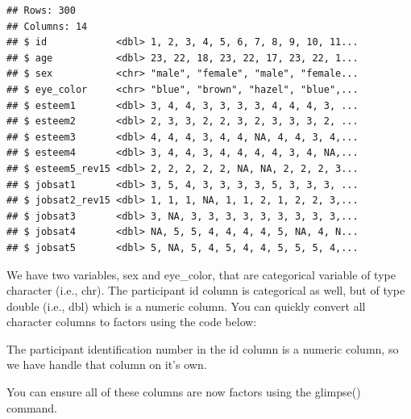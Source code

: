 \documentclass[
]{krantz}
\makeatletter
\newenvironment{Shaded}{\begin{snugshade}}{\end{snugshade}}
\newcommand{\DataTypeTok}[1]{\textcolor[rgb]{0.27,0.27,0.27}{#1}}
\newcommand{\KeywordTok}[1]{\textcolor[rgb]{0.27,0.27,0.27}{\textbf{#1}}}
\newcommand{\NormalTok}[1]{#1}
\newcommand{\OperatorTok}[1]{\textcolor[rgb]{0.43,0.43,0.43}{\textbf{#1}}}
\newcommand{\StringTok}[1]{\textcolor[rgb]{0.5,0.5,0.5}{#1}}
\newenvironment{kframe}{%
\medskip{}
\setlength{\fboxsep}{.8em}
 \def\at@end@of@kframe{}%
 \ifinner\ifhmode%
  \def\at@end@of@kframe{\end{minipage}}%
  \begin{minipage}{\columnwidth}%
 \fi\fi%
 \def\FrameCommand##1{\hskip\@totalleftmargin \hskip-\fboxsep
 \colorbox{shadecolor}{##1}\hskip-\fboxsep
     \hskip-\linewidth \hskip-\@totalleftmargin \hskip\columnwidth}%
 \MakeFramed {\advance\hsize-\width
   \@totalleftmargin\z@ \linewidth\hsize
   \@setminipage}}%
 {\par\unskip\endMakeFramed%
 \at@end@of@kframe}
\renewenvironment{Shaded}{\begin{kframe}}{\end{kframe}}
\makeatother
\begin{document}
\begin{verbatim}
## Rows: 300
## Columns: 14
## $ id            <dbl> 1, 2, 3, 4, 5, 6, 7, 8, 9, 10, 11...
## $ age           <dbl> 23, 22, 18, 23, 22, 17, 23, 22, 1...
## $ sex           <chr> "male", "female", "male", "female...
## $ eye_color     <chr> "blue", "brown", "hazel", "blue",...
## $ esteem1       <dbl> 3, 4, 4, 3, 3, 3, 3, 4, 4, 4, 3, ...
## $ esteem2       <dbl> 2, 3, 3, 2, 2, 3, 2, 3, 3, 3, 2, ...
## $ esteem3       <dbl> 4, 4, 4, 3, 4, 4, NA, 4, 4, 3, 4,...
## $ esteem4       <dbl> 3, 4, 4, 3, 4, 4, 4, 4, 3, 4, NA,...
## $ esteem5_rev15 <dbl> 2, 2, 2, 2, 2, NA, NA, 2, 2, 2, 3...
## $ jobsat1       <dbl> 3, 5, 4, 3, 3, 3, 3, 5, 3, 3, 3, ...
## $ jobsat2_rev15 <dbl> 1, 1, 1, NA, 1, 1, 2, 1, 2, 2, 3,...
## $ jobsat3       <dbl> 3, NA, 3, 3, 3, 3, 3, 3, 3, 3, 3,...
## $ jobsat4       <dbl> NA, 5, 5, 4, 4, 4, 4, 5, NA, 4, N...
## $ jobsat5       <dbl> 5, NA, 5, 4, 5, 4, 4, 5, 5, 5, 4,...
\end{verbatim}

We have two variables, sex and eye\_color, that are categorical variable of type character (i.e., chr). The participant id column is categorical as well, but of type double (i.e., dbl) which is a numeric column. You can quickly convert all character columns to factors using the code below:

\begin{Shaded}
\end{Shaded}

The participant identification number in the id column is a numeric column, so we have handle that column on it's own.

\begin{Shaded}
\end{Shaded}

You can ensure all of these columns are now factors using the glimpse() command.
\end{document}
